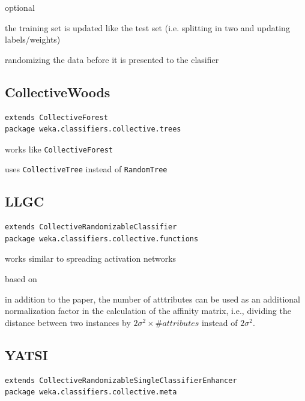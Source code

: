 \documentclass[a4paper]{book}
\begin{document}
\noindent optional
\begin{tight_itemize}
	\item the training set is updated like the test set (i.e. splitting in two 
	and updating labels/weights)
	\item randomizing the data before it is presented to the clasifier
\end{tight_itemize}


\subsection{CollectiveWoods}
\begin{verbatim}
extends CollectiveForest
package weka.classifiers.collective.trees
\end{verbatim}

\begin{tight_itemize}
	\item works like \texttt{CollectiveForest}
	\item uses \texttt{CollectiveTree} instead of \texttt{RandomTree}
\end{tight_itemize}


\subsection{LLGC}
\begin{verbatim}
extends CollectiveRandomizableClassifier
package weka.classifiers.collective.functions
\end{verbatim}

\begin{tight_itemize}
	\item works similar to spreading activation networks
	\item based on \cite{zhou}
	\item in addition to the paper, the number of atttributes can be used as 
	an additional normalization factor in the calculation of the affinity 
	matrix, i.e., dividing the distance between two instances by 
	$2\sigma^2 \times \#attributes$ instead of $2\sigma^2$.
\end{tight_itemize}


\subsection{YATSI}
\begin{verbatim}
extends CollectiveRandomizableSingleClassifierEnhancer
package weka.classifiers.collective.meta
\end{verbatim}
\end{document}

